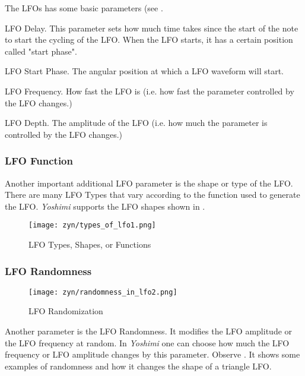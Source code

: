    The LFOs has some basic parameters (see
   .

   \setcounter{ItemCounter}{0}      %

   LFO Delay.
   This parameter sets how much time takes since the start of the note to
   start the cycling of the LFO.
   When the LFO starts, it has a certain position called "start phase".

   LFO Start Phase.
   The angular position at which a LFO waveform will start.

   LFO Frequency.
   How fast the LFO is (i.e. how fast the parameter controlled by
   the LFO changes.)

   LFO Depth.
   The amplitude of the LFO (i.e. how much the parameter is controlled by
   the LFO changes.)

\subsubsection{LFO Function}
\label{subsubsec:lfo_function}

   Another important additional LFO parameter is the shape or type of the
   LFO. There are many LFO Types that vary according to the function used to
   generate the LFO. \textsl{Yoshimi} supports the LFO shapes shown in
   .

\begin{figure}[H]
   \centering 
   \texttt{[image: zyn/types\_of\_lfo1.png]}
   \caption[LFO Functions]{LFO Types, Shapes, or Functions}
   \label{fig:types_of_lfo}
\end{figure}

\subsubsection{LFO Randomness}
\label{subsubsec:lfo_randomness}

\begin{figure}[H]
   \centering 
   \texttt{[image: zyn/randomness\_in\_lfo2.png]}
   \caption[LFO Randomization]{LFO Randomization}
   \label{fig:randomness_in_lfo}
\end{figure}

   Another parameter is the LFO Randomness. It modifies the LFO amplitude or
   the LFO frequency at random. In \textsl{Yoshimi}
   one can choose how much the LFO
   frequency or LFO amplitude changes by this parameter.
   Observe .
   It shows some examples of randomness and how it changes the shape of a
   triangle LFO.


